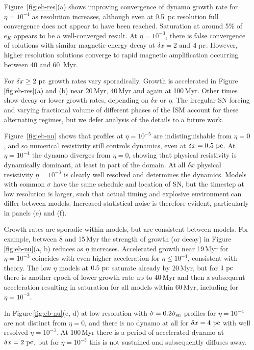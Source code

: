 \documentclass[preprint2]{aastex63}
\newcommand\SNr{\dot\sigma_{\rm sn}}
\newcommand\pc{~ {\rm pc}}
\newcommand\dx{ {\delta x}}
\begin{document}
      Figure~\ref{fig:eb-res}(a) shows improving convergence of dynamo growth 
      rate for $\eta=10^{-4}$
      as resolution increases, although even at 0.5~pc resolution full
      convergence does not appear to have been reached.
Saturation at around 5\% of $\overline{e_K}$
     appears to be a well-converged result.
 At $\eta=10^{-3}$, there is false convergence \citep{FMA91} of solutions with
 similar magnetic energy decay at $\dx=2$ and $4\pc$.
 However, higher resolution solutions converge to rapid magnetic
 amplification occurring between 40 and 60~Myr.
 
 For $\dx\geq2\pc$ growth rates vary sporadically.
 Growth is accelerated in Figure\,\ref{fig:eb-res}(a) and (b) near 20\,Myr,
 40\,Myr and again at 100\,Myr.
 Other times show decay or lower growth rates, depending on $\dx$ or $\eta$.
 The irregular SN forcing and varying fractional volume of
      different phases of the ISM  
 account for these alternating regimes, but we defer analysis of the details
 to a future work.
 

       Figure~\ref{fig:eb-nu} shows that 
 profiles at $\eta=10^{-5}$ are
 indistinguishable from $\eta=0$, and so numerical resistivity still
 controls dynamics,
     even at $\delta x = 0.5\pc$.
 At $\eta=10^{-4}$ the dynamo diverges from $\eta=0$, showing that physical
 resistivity is dynamically dominant, at least in part of the domain.
 At all $\dx$ physical resistivity $\eta=10^{-3}$ is clearly well resolved
 and determines the dynamics.
 Models with common $\dot\sigma$ have the same schedule and location of SN,
 but the timestep at low resolution is larger, such that actual timing and
 explosive environment can differ between models.
 Increased statistical noise is therefore evident, particularly in panels (e) and (f).


 Growth rates are sporadic within models, but are consistent between
 models.
 For example, between 8 and 15\,Myr the strength of growth (or decay) in 
 Figure\,\ref{fig:eb-nu}(a, b) reduces as $\eta$ increases.
 Accelerated growth near 19\,Myr for $\eta=10^{-3}$ coincides with
 even higher acceleration for $\eta\le10^{-4}$, consistent with theory.
 The low $\eta$ models at $0.5\pc$ saturate already by 20\,Myr, but for $1\pc$
 there is another epoch of lower growth rate up to 40\,Myr and then a
 subsequent acceleration resulting in saturation for all models within
 60\,Myr, including for $\eta=10^{-3}$.

 In Figure\,\ref{fig:eb-nu}(c, d) at low resolution with
 $\dot\sigma=0.2\SNr$ profiles for $\eta=10^{-4}$ are not distinct from $\eta=0$,
 and there is no dynamo at all for $\dx=4\pc$ with well resolved $\eta=10^{-3}$.
 At 100\,Myr there is a period of accelerated dynamo at $\dx=2\pc$, but 
 for $\eta=10^{-3}$ this is not sustained and subsequently diffuses away.
\end{document}
